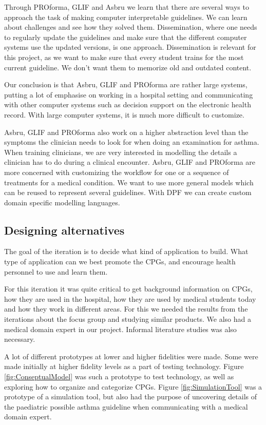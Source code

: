 Through PROforma, GLIF and Asbru we learn that there are several ways to approach the task of making computer interpretable guidelines. We can learn about challenges and see how they solved them. Dissemination, where one needs to regularly update the guidelines and make sure that the different computer systems use the updated versions, is one approach. Dissemination is relevant for this project, as we want to make sure that every student trains for the most current guideline. We don't want them to memorize old and outdated content.

Our conclusion is that Asbru, GLIF and PROforma are rather large systems, putting a lot of emphasise on working in a hospital setting and communicating with other computer systems such as decision support on the electronic health record. With large computer systems, it is much more difficult to customize.

Asbru, GLIF and PROforma also work on a higher abstraction level than the symptoms the clinician needs to look for when doing an examination for asthma. When training clinicians, we are very interested in modelling the details a clinician has to do during a clinical encounter. Asbru, GLIF and PROforma are more concerned with customizing the workflow for one or a sequence of treatments for a medical condition. We want to use more general models which can be reused to represent several guidelines. With DPF we can create custom domain specific modelling languages.


\subsection{Designing alternatives}
The goal of the iteration is to decide what kind of application to build. What type of application can we best promote the CPGs, and encourage health personnel to use and learn them.

For this iteration it was quite critical to get background information on CPGs, how they are used in the hospital, how they are used by medical students today and how they work in different areas. For this we needed the results from the iterations about the focus group and studying similar products. We also had a medical domain expert in our project. Informal literature studies was also necessary.

A lot of different prototypes at lower and higher fidelities were made. Some were made initially at higher fidelity levels as a part of testing technology. Figure \ref{fig:ConseptualModel} was such a prototype to  test technology, as well as exploring how to organize and categorize CPGs. Figure \ref{fig:SimulationTool} was a prototype of a simulation tool, but also had the purpose of uncovering details of the paediatric possible asthma guideline \parencite{RepublicofKeny2016} when communicating with a medical domain expert. 

